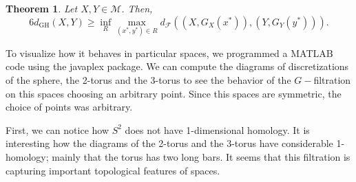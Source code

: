 \documentclass[a4paper,12pt,reqno, english]{amsart}
\newcommand{\dgh}{d_{\mathrm{GH}}}
\newcommand{\M}{\mathcal{M}}
\newcommand{\F}{\mathcal{F}}
\theoremstyle{plain}
\newtheorem{thm}{Theorem}[section]
\theoremstyle{definition}
\begin{document}
{{\begin{thm}\label{thm:stabtree}
Let $X,Y\in \M$. Then, 
$$ 6\dgh(X,Y)\geq \inf_{R}\max_{(x^*,y^*)\in R}d_{\F}((X,G_X(x^*)), (Y,G_Y(y^*)) ).$$
\end{thm}

To visualize how it behaves in particular spaces, we programmed a MATLAB code using the javaplex package. We can compute the diagrams of discretizations of the sphere, the 2-torus and the 3-torus to see the behavior of the $G-$filtration on this spaces choosing an arbitrary point. Since this spaces are symmetric, the choice of points was arbitrary. 

First, we can notice how $S^2$ does not have 1-dimensional homology. It is interesting how the diagrams of the 2-torus and the 3-torus have considerable 1-homology; mainly that the torus has two long bars. It seems that this filtration is capturing important topological features of spaces. 


}}
\end{document}
